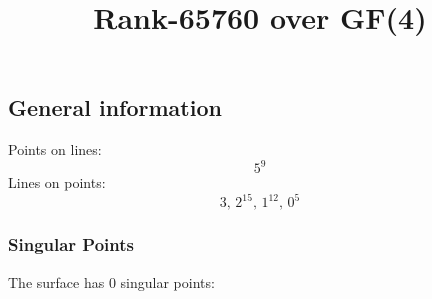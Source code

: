 \documentclass{article}
\newcommand\setTBstruts{\def\T{\rule{0pt}{2.6ex}}%
\def\B{\rule[-1.2ex]{0pt}{0pt}}}
\begin{document}
 
\setTBstruts



{\allowdisplaybreaks%






\title{Rank-65760 over GF(4)}
\author{}%
\maketitle%
%
{}



\subsection*{General information}
Points on lines:
$$
5^9$$
Lines on points:
$$
3,\,2^{15},\,1^{12},\,0^5$$
\subsubsection*{Singular Points}
The surface has 0 singular points:\\
\begin{align*}
\end{align*}
}
\end{document}
